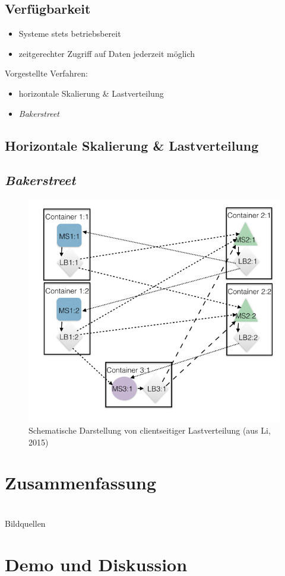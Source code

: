 \documentclass{beamer}
\begin{document}
\subsection{Verfügbarkeit}
\begin{frame}{\insertsubsection}
	\begin{itemize}
		\item Systeme stets betriebsbereit
		\item zeitgerechter Zugriff auf Daten jederzeit möglich
	\end{itemize}
	\vspace*{1cm}
	\pause
	Vorgestellte Verfahren:
	\begin{itemize}
		\item horizontale Skalierung \& Lastverteilung
		\item \textit{Bakerstreet}
	\end{itemize}
\end{frame}


\subsection{Horizontale Skalierung \& Lastverteilung}

\subsection{\em Bakerstreet}
\begin{frame}{\insertsubsection}
	\begin{figure}
		\centering
		\includegraphics[width=.65\linewidth]{img/clientloadbal}
		\caption{Schematische Darstellung von clientseitiger Lastverteilung (aus Li, 2015)}
		\label{fig:clientseitige_lastverteilung}
	\end{figure}
\end{frame}

\section{Zusammenfassung}

\section{\bibname}
\begin{frame}[allowframebreaks]{\bibname}
	\AtBeginSection{}
	\nocite{*}
	
	
\end{frame}
\begin{frame}[allowframebreaks]{Bildquellen}
\end{frame}

\section{Demo und Diskussion}
\end{document}
